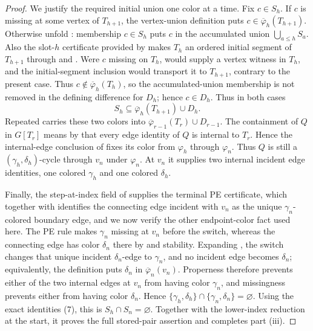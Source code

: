 \begin{proof}
We justify the required initial union one color at a time.  Fix
\(c\in S_h\).  If \(c\) is missing at some vertex of \(T_{h+1}\), the
vertex-union definition  puts
\(c\in\overline\varphi_h(T_{h+1})\).  Otherwise unfold
: membership \(c\in S_h\) puts \(c\) in the
accumulated union \(\bigcup_{a\leq h}S_a\).  Also the slot-\(h\) certificate
provided by  makes \(T_h\) an ordered initial segment
of \(T_{h+1}\) through  and
.  Were \(c\) missing on \(T_h\),
 would supply a vertex witness in \(T_h\), and
the initial-segment inclusion would transport it to \(T_{h+1}\), contrary
to the present case.  Thus \(c\notin\overline\varphi_h(T_h)\), so the
accumulated-union membership is not removed in the defining difference for
\(D_h\); hence \(c\in D_h\).  Thus in both cases
\[
                 S_h\subseteq
                 \overline\varphi_h(T_{h+1})\cup D_h.
\]
Repeated  carries these two colors into
\(\overline\varphi_{r-1}(T_r)\cup D_{r-1}\).  The containment of \(Q\) in
\(G[T_r]\) means by  that every edge identity of
\(Q\) is internal to \(T_r\).  Hence the internal-edge conclusion of
 fixes its color from \(\varphi_h\)
through \(\varphi_n\).  Thus \(Q\) is still a
\((\gamma_h,\delta_h)\)-cycle through \(v_n\) under \(\varphi_n\).  At
\(v_n\) it supplies two internal incident edge identities, one colored
\(\gamma_h\) and one colored \(\delta_h\).

Finally, the step-at-index field of  supplies the
terminal PE certificate, which together with
 identifies the connecting edge
incident with \(v_n\) as the unique \(\gamma_n\)-colored boundary edge,
and we now verify the other endpoint-color fact used here.  The PE rule
 makes \(\gamma_n\) missing at \(v_n\)
before the switch, whereas the connecting edge has color \(\delta_n\)
there by  and stability.  Expanding
, the switch changes that unique incident
\(\delta_n\)-edge to \(\gamma_n\), and no incident edge becomes
\(\delta_n\); equivalently, the definition  puts
\(\delta_n\) in \(\overline\varphi_n(v_n)\).  Properness
therefore prevents either of the two internal edges at \(v_n\) from having
color \(\gamma_n\), and missingness prevents either from having color
\(\delta_n\).  Hence
\(\{\gamma_h,\delta_h\}\cap\{\gamma_n,\delta_n\}=\varnothing\).
Using the exact identities (7), this is \(S_h\cap S_n=\varnothing\).
Together with the lower-index reduction at the start, it proves the full
stored-pair assertion and completes part (iii).
\end{proof}
